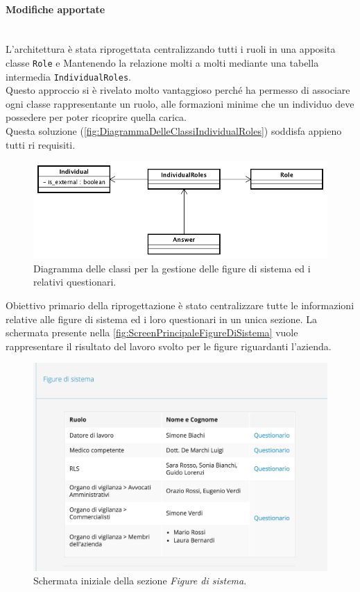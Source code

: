 	\paragraph*{Modifiche apportate}\mbox{} \\
	L'architettura è stata riprogettata centralizzando tutti i ruoli in una apposita classe \texttt{Role} e Mantenendo la relazione molti a molti mediante una tabella intermedia \texttt{IndividualRoles}. \\
	Questo approccio si è rivelato molto vantaggioso perché ha permesso di associare ogni classe rappresentante un ruolo, alle formazioni minime che un individuo deve possedere per poter ricoprire quella carica. \\
	Questa soluzione (\autoref{fig:DiagrammaDelleClassiIndividualRoles}) soddisfa appieno tutti ri requisiti.\\
		\begin{figure}[H]
			\begin{center}
				\includegraphics[width=12cm]{Pics/UMLClassiFigureDiSistema.png}
				\caption{
					Diagramma delle classi per la gestione delle figure di sistema ed i relativi questionari.}
				\label{fig:DiagrammaDelleClassiIndividualRoles}
			\end{center}
		\end{figure}
	Obiettivo primario della riprogettazione è stato centralizzare tutte le informazioni relative alle figure di sistema ed i loro questionari in un unica sezione. 
	La schermata presente nella  \autoref{fig:ScreenPrincipaleFigureDiSistema} vuole rappresentare il risultato del lavoro svolto per le figure riguardanti l'azienda. \\
		\begin{figure}[H]
			\begin{center}
				\includegraphics[width=12cm]{Pics/ScreenFigureDiSistemaProspetto.png}
				\caption{
					Schermata iniziale della sezione \textit{Figure di sistema}.}
				\label{fig:ScreenPrincipaleFigureDiSistema}
			\end{center}
		\end{figure}
